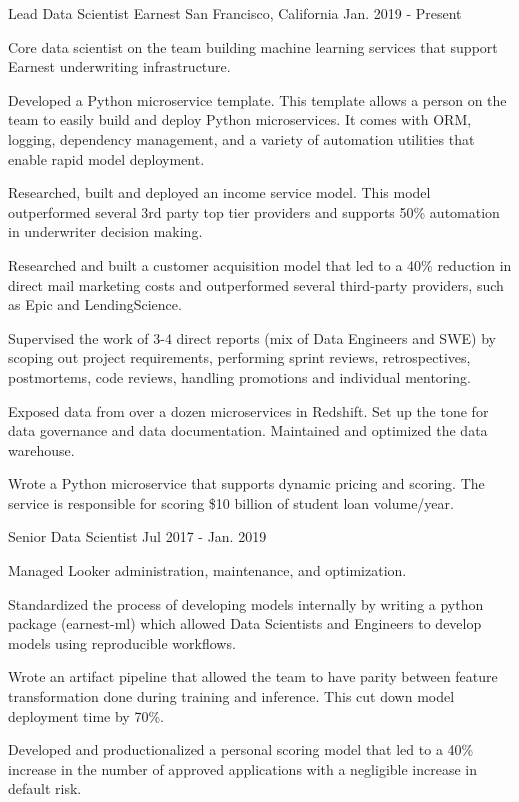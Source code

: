 
\begin{cventries}
\cventry
{Lead Data Scientist} %
{Earnest} %
{San Francisco, California} %
{Jan. 2019 - Present} %
{ %
\begin{cvitems}
\item {Core data scientist on the team building machine learning services that support Earnest underwriting infrastructure.}
\item {Developed a Python microservice template. This template allows a person on the team to easily build and deploy Python microservices. It comes with ORM, logging, dependency management, and a variety of automation utilities that enable rapid model deployment.}
\item {Researched, built and deployed an income service model. This model outperformed several 3rd party top tier providers and supports 50\% automation in underwriter decision making.}
\item {Researched and built a customer acquisition model that led to a 40\% reduction in direct mail marketing costs and outperformed several third-party providers, such as Epic and LendingScience.}
\item {Supervised the work of 3-4 direct reports (mix of Data Engineers and SWE) by scoping out project requirements, performing sprint reviews, retrospectives, postmortems, code reviews, handling promotions and individual mentoring.}
\item {Exposed data from over a dozen microservices in Redshift. Set up the tone for data governance and data documentation. Maintained and optimized the data warehouse.}
\item {Wrote a Python microservice that supports dynamic pricing and scoring. The service is responsible for scoring \$10 billion of student loan volume/year.}
\end{cvitems}
}

\cventry
{Senior Data Scientist} %
{} %
{} %
{Jul 2017 - Jan. 2019}
{ %
\begin{cvitems}
\item {Managed Looker administration, maintenance, and optimization.}
\item {Standardized the process of developing models internally by writing a python package (earnest-ml) which allowed Data Scientists and Engineers to develop models using reproducible workflows.}
\item {Wrote an artifact pipeline that allowed the team to have parity between feature transformation done during training and inference. This cut down model deployment time by 70\%.}
\item {Developed and productionalized a personal scoring model that led to a 40\% increase in the number of approved applications with a negligible increase in default risk.}
\end{cvitems}
}


\end{cventries}
